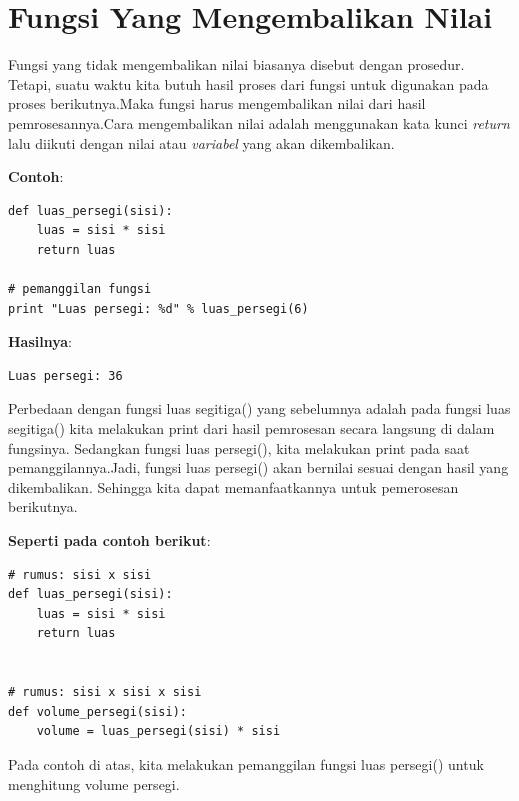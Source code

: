 \section{Fungsi Yang Mengembalikan Nilai}
Fungsi yang tidak mengembalikan nilai biasanya disebut dengan prosedur.
Tetapi, suatu waktu kita butuh hasil proses dari fungsi untuk digunakan pada proses berikutnya.Maka fungsi harus mengembalikan nilai dari hasil pemrosesannya.Cara mengembalikan nilai adalah menggunakan kata kunci \textit{return} lalu diikuti dengan nilai atau \textit{variabel} yang akan dikembalikan.
\par\textbf{Contoh}:
\begin{lstlisting}
def luas_persegi(sisi):
    luas = sisi * sisi
    return luas

# pemanggilan fungsi
print "Luas persegi: %d" % luas_persegi(6)
\end{lstlisting}
\par \textbf{Hasilnya}:
\begin{lstlisting}
Luas persegi: 36
\end{lstlisting}
Perbedaan dengan fungsi luas segitiga() yang sebelumnya adalah pada fungsi luas segitiga() kita melakukan print dari hasil pemrosesan secara langsung di dalam fungsinya. Sedangkan fungsi luas persegi(), kita melakukan print pada saat pemanggilannya.Jadi, fungsi luas persegi() akan bernilai sesuai dengan hasil yang dikembalikan.
Sehingga kita dapat memanfaatkannya untuk pemerosesan berikutnya.
\par\textbf{Seperti pada contoh berikut}:
\begin{lstlisting}
# rumus: sisi x sisi
def luas_persegi(sisi):
    luas = sisi * sisi
    return luas


# rumus: sisi x sisi x sisi
def volume_persegi(sisi):
    volume = luas_persegi(sisi) * sisi
\end{lstlisting}
\par Pada contoh di atas, kita melakukan pemanggilan fungsi luas persegi() untuk menghitung volume persegi.
